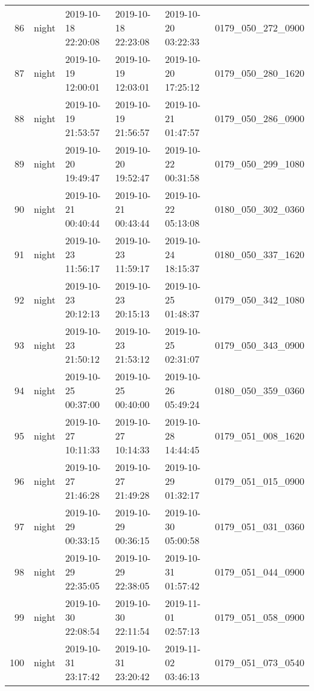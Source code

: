 \begin{longtable}{rlllll}
      86 &    night & 2019-10-18 22:20:08 & 2019-10-18 22:23:08 & 2019-10-20 03:22:33 & 0179\_050\_272\_0900 \\
      87 &    night & 2019-10-19 12:00:01 & 2019-10-19 12:03:01 & 2019-10-20 17:25:12 & 0179\_050\_280\_1620 \\
      88 &    night & 2019-10-19 21:53:57 & 2019-10-19 21:56:57 & 2019-10-21 01:47:57 & 0179\_050\_286\_0900 \\
      89 &    night & 2019-10-20 19:49:47 & 2019-10-20 19:52:47 & 2019-10-22 00:31:58 & 0179\_050\_299\_1080 \\
      90 &    night & 2019-10-21 00:40:44 & 2019-10-21 00:43:44 & 2019-10-22 05:13:08 & 0180\_050\_302\_0360 \\
      91 &    night & 2019-10-23 11:56:17 & 2019-10-23 11:59:17 & 2019-10-24 18:15:37 & 0180\_050\_337\_1620 \\
      92 &    night & 2019-10-23 20:12:13 & 2019-10-23 20:15:13 & 2019-10-25 01:48:37 & 0179\_050\_342\_1080 \\
      93 &    night & 2019-10-23 21:50:12 & 2019-10-23 21:53:12 & 2019-10-25 02:31:07 & 0179\_050\_343\_0900 \\
      94 &    night & 2019-10-25 00:37:00 & 2019-10-25 00:40:00 & 2019-10-26 05:49:24 & 0180\_050\_359\_0360 \\
      95 &    night & 2019-10-27 10:11:33 & 2019-10-27 10:14:33 & 2019-10-28 14:44:45 & 0179\_051\_008\_1620 \\
      96 &    night & 2019-10-27 21:46:28 & 2019-10-27 21:49:28 & 2019-10-29 01:32:17 & 0179\_051\_015\_0900 \\
      97 &    night & 2019-10-29 00:33:15 & 2019-10-29 00:36:15 & 2019-10-30 05:00:58 & 0179\_051\_031\_0360 \\
      98 &    night & 2019-10-29 22:35:05 & 2019-10-29 22:38:05 & 2019-10-31 01:57:42 & 0179\_051\_044\_0900 \\
      99 &    night & 2019-10-30 22:08:54 & 2019-10-30 22:11:54 & 2019-11-01 02:57:13 & 0179\_051\_058\_0900 \\
     100 &    night & 2019-10-31 23:17:42 & 2019-10-31 23:20:42 & 2019-11-02 03:46:13 & 0179\_051\_073\_0540 \\
\end{longtable}
